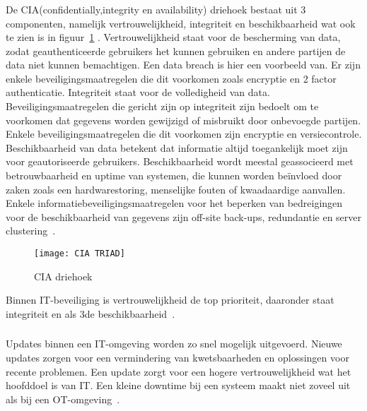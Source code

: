 \subsubsection{}
\label{subsec:CIA driehoek}
De CIA(confidentially,integrity en availability) driehoek bestaat uit 3 componenten, namelijk vertrouwelijkheid, integriteit en beschikbaarheid wat ook te zien is in figuur~\ref{fig:2.4} . Vertrouwelijkheid staat voor de bescherming van data, zodat geauthenticeerde gebruikers het kunnen gebruiken en andere partijen de data niet kunnen bemachtigen. Een data breach is hier een voorbeeld van. Er zijn enkele beveiligingsmaatregelen die dit voorkomen zoals encryptie en 2 factor authenticatie. Integriteit staat voor de volledigheid van data. Beveiligingsmaatregelen die gericht zijn op integriteit zijn bedoelt om te voorkomen dat gegevens worden gewijzigd of misbruikt door onbevoegde partijen. Enkele beveiligingsmaatregelen die dit voorkomen zijn encryptie en versiecontrole. Beschikbaarheid van data betekent dat informatie altijd toegankelijk moet zijn voor geautoriseerde gebruikers. Beschikbaarheid wordt meestal geassocieerd met betrouwbaarheid en uptime van systemen, die kunnen worden beïnvloed door zaken zoals een hardwarestoring, menselijke fouten of kwaadaardige aanvallen. Enkele informatiebeveiligingsmaatregelen voor het beperken van bedreigingen voor de beschikbaarheid van gegevens zijn off-site back-ups, redundantie en server clustering~\autocite{Debbie2019}. 
\begin{figure}
    \texttt{[image: CIA TRIAD]}
    \caption{CIA driehoek\autocite{Debbie2019} \label{fig:2.4}} 
    
\end{figure}
 
 Binnen IT-beveiliging is vertrouwelijkheid de top prioriteit, daaronder staat integriteit en als 3de beschikbaarheid~\autocite{Max2020}.
 
\subsubsection{}
\label{subsec:Updates IT}
Updates binnen een IT-omgeving worden zo snel mogelijk uitgevoerd. Nieuwe updates zorgen voor een vermindering van kwetsbaarheden en oplossingen voor recente problemen. Een update zorgt voor een hogere vertrouwelijkheid wat het hoofddoel is van IT. Een kleine downtime bij een systeem maakt niet zoveel uit als bij een OT-omgeving~\autocite{Max2020}. 

